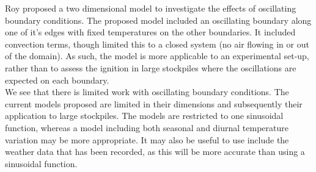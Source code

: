 Roy \cite{roy18} proposed a two dimensional model to investigate the effects of oscillating boundary conditions. The proposed model included an oscillating boundary along one of it's edges with fixed temperatures on the other boundaries. It included convection terms, though limited this to a closed system (no air flowing in or out of the domain). As such, the model is more applicable to an experimental set-up, rather than to assess the ignition in large stockpiles where the oscillations are expected on each boundary.\\ 
We see that there is limited work with oscillating boundary conditions. The current models proposed are limited in their dimensions and subsequently their application to large stockpiles. The models are restricted to one sinusoidal function, whereas a model including both seasonal and diurnal temperature variation may be more appropriate. It may also be useful to use include the weather data that has been recorded, as this will be more accurate than using a sinusoidal function.

